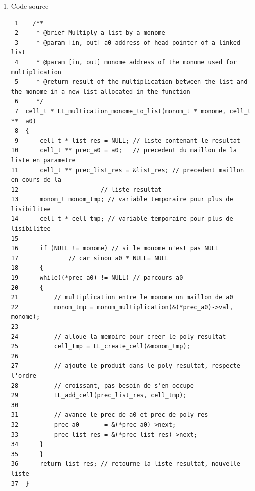 \documentclass[11pt]{article}
\begin{document}
\begin{enumerate}
\item Code source
\label{sec:org2530a12}

\begin{verbatim}
 1    /**
 2     * @brief Multiply a list by a monome
 3     * @param [in, out] a0 address of head pointer of a linked list
 4     * @param [in, out] monome address of the monome used for multiplication
 5     * @return result of the multiplication between the list and the monome in a new list allocated in the function
 6     */
 7  cell_t * LL_multication_monome_to_list(monom_t * monome, cell_t **  a0)
 8  {
 9      cell_t * list_res = NULL; // liste contenant le resultat
10      cell_t ** prec_a0 = a0;   // precedent du maillon de la liste en parametre
11      cell_t ** prec_list_res = &list_res; // precedent maillon en cours de la
12  					 // liste resultat
13      monom_t monom_tmp; // variable temporaire pour plus de lisibilitee
14      cell_t * cell_tmp; // variable temporaire pour plus de lisibilitee
15  
16      if (NULL != monome) // si le monome n'est pas NULL
17  			// car sinon a0 * NULL= NULL
18      {
19  	while((*prec_a0) != NULL) // parcours a0
20  	{
21  	    // multiplication entre le monome un maillon de a0
22  	    monom_tmp = monom_multiplication(&(*prec_a0)->val, monome);
23  
24  	    // alloue la memoire pour creer le poly resultat
25  	    cell_tmp = LL_create_cell(&monom_tmp);
26  
27  	    // ajoute le produit dans le poly resultat, respecte l'ordre
28  	    // croissant, pas besoin de s'en occupe  
29  	    LL_add_cell(prec_list_res, cell_tmp);
30  
31  	    // avance le prec de a0 et prec de poly res
32  	    prec_a0       = &(*prec_a0)->next;
33  	    prec_list_res = &(*prec_list_res)->next;
34  	}
35      }
36      return list_res; // retourne la liste resultat, nouvelle liste
37  }
\end{verbatim}


\end{enumerate}
\end{document}
